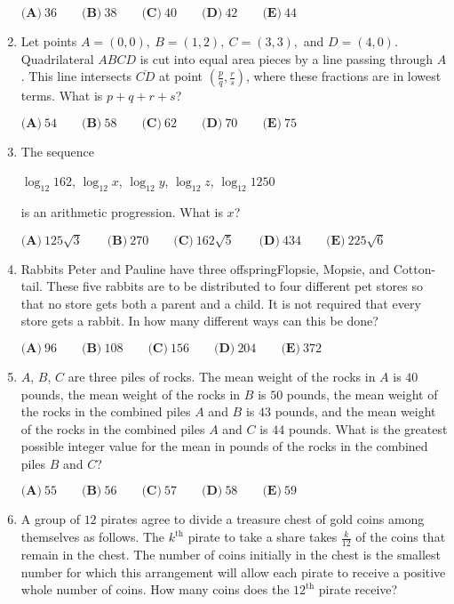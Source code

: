 \documentclass{article}
\begin{document}
\begin{enumerate}[label=\arabic*., itemsep=0.5em]
\( \textbf{(A)}\ 36\qquad\textbf{(B)}\ 38\qquad\textbf{(C)}\ 40\qquad\textbf{(D)}\ 42\qquad\textbf{(E)}\ 44\)\par \vspace{0.5em}\item Let points \( A = (0,0) , \ B = (1,2), \ C = (3,3), \) and \( D = (4,0) \). Quadrilateral \( ABCD \) is cut into equal area pieces by a line passing through \( A \). This line intersects \( \overline{CD} \) at point \( \left (\frac{p}{q}, \frac{r}{s} \right ) \), where these fractions are in lowest terms. What is \( p + q + r + s \)?

\( \textbf{(A)} \ 54 \qquad \textbf{(B)} \ 58 \qquad  \textbf{(C)} \ 62 \qquad \textbf{(D)} \ 70 \qquad \textbf{(E)} \ 75 \)\par \vspace{0.5em}\item The sequence

\(\log_{12}{162}\), \(\log_{12}{x}\), \(\log_{12}{y}\), \(\log_{12}{z}\), \(\log_{12}{1250}\)

is an arithmetic progression. What is \(x\)?

\( \textbf{(A)} \ 125\sqrt{3} \qquad \textbf{(B)} \ 270 \qquad \textbf{(C)} \ 162\sqrt{5} \qquad \textbf{(D)} \ 434 \qquad \textbf{(E)} \ 225\sqrt{6}\)\par \vspace{0.5em}\item Rabbits Peter and Pauline have three offspringFlopsie, Mopsie, and Cotton-tail. These five rabbits are to be distributed to four different pet stores so that no store gets both a parent and a child. It is not required that every store gets a rabbit. In how many different ways can this be done?

\(\textbf{(A)} \ 96 \qquad  \textbf{(B)} \ 108 \qquad  \textbf{(C)} \ 156 \qquad  \textbf{(D)} \ 204 \qquad  \textbf{(E)} \ 372 \)\par \vspace{0.5em}\item \(A\), \(B\), \(C\) are three piles of rocks. The mean weight of the rocks in \(A\) is \(40\) pounds, the mean weight of the rocks in \(B\) is \(50\) pounds, the mean weight of the rocks in the combined piles \(A\) and \(B\) is \(43\) pounds, and the mean weight of the rocks in the combined piles \(A\) and \(C\) is \(44\) pounds. What is the greatest possible integer value for the mean in pounds of the rocks in the combined piles \(B\) and \(C\)?

\( \textbf{(A)} \ 55 \qquad \textbf{(B)} \ 56 \qquad \textbf{(C)} \ 57 \qquad \textbf{(D)} \ 58 \qquad \textbf{(E)} \ 59\)\par \vspace{0.5em}\item A group of \( 12 \) pirates agree to divide a treasure chest of gold coins among themselves as follows. The \( k^\text{th} \) pirate to take a share takes \( \frac{k}{12} \) of the coins that remain in the chest. The number of coins initially in the chest is the smallest number for which this arrangement will allow each pirate to receive a positive whole number of coins. How many coins does the \( 12^{\text{th}} \) pirate receive?


\end{enumerate}
\end{document}

